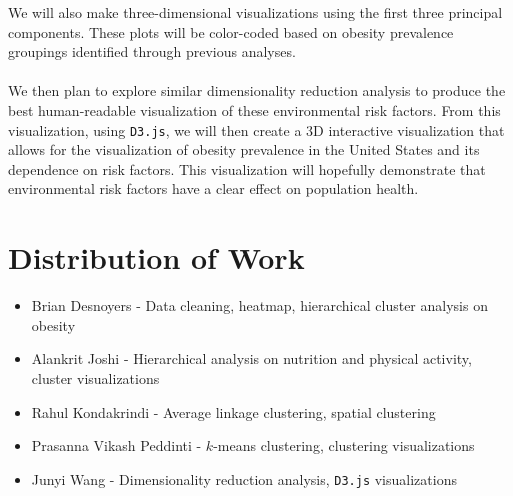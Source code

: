 \documentclass{article}
\begin{document}
We will also make three-dimensional visualizations using the first three principal components. These plots will be color-coded based on obesity prevalence groupings identified through previous analyses.
\\\\
We then plan to explore similar dimensionality reduction analysis to produce the best human-readable visualization of these environmental risk factors. From this visualization, using \verb|D3.js|, we will then create a 3D interactive visualization that allows for the visualization of obesity prevalence in the United States and its dependence on risk factors. This visualization will hopefully demonstrate that environmental risk factors have a clear effect on population health.

\section{Distribution of Work}
\label{distribution}

\begin{itemize}
  \item Brian Desnoyers - Data cleaning, heatmap, hierarchical cluster analysis on obesity
  \item Alankrit Joshi - Hierarchical analysis on nutrition and physical activity, cluster visualizations
  \item Rahul Kondakrindi - Average linkage clustering, spatial clustering
  \item Prasanna Vikash Peddinti - $k$-means clustering, clustering visualizations
  \item Junyi Wang - Dimensionality reduction analysis, \verb|D3.js| visualizations
\end{itemize}




\end{document}
